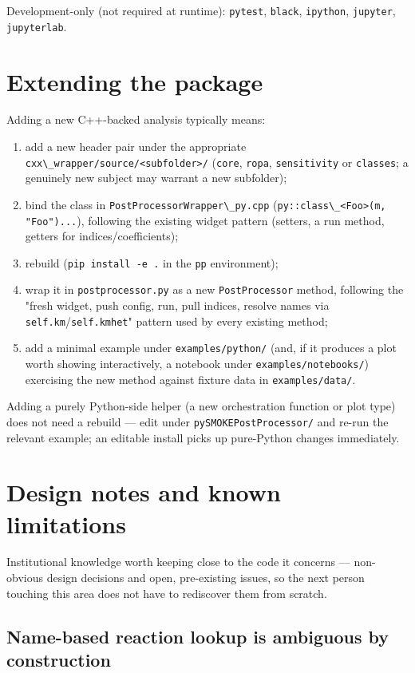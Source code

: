 \documentclass[11pt,a4paper]{report}
\newcommand{\pkg}[1]{\lstinline|#1|}
\begin{document}
Development-only (not required at runtime): \pkg{pytest}, \pkg{black},
\pkg{ipython}, \pkg{jupyter}, \pkg{jupyterlab}.

\chapter{Extending the package}

Adding a new C++-backed analysis typically means:
\begin{enumerate}
\item add a new header pair under the appropriate
  \pkg{cxx\_wrapper/source/<subfolder>/} (\pkg{core}, \pkg{ropa},
  \pkg{sensitivity} or \pkg{classes}; a genuinely new subject may warrant a
  new subfolder);
\item bind the class in \pkg{PostProcessorWrapper\_py.cpp}
  (\pkg{py::class\_<Foo>(m, "Foo")...}), following the existing widget
  pattern (setters, a run method, getters for indices/coefficients);
\item rebuild (\pkg{pip install -e .} in the \pkg{pp} environment);
\item wrap it in \pkg{postprocessor.py} as a new \pkg{PostProcessor} method,
  following the "fresh widget, push config, run, pull indices, resolve
  names via \pkg{self.km}/\pkg{self.kmhet}" pattern used by every existing
  method;
\item add a minimal example under \pkg{examples/python/} (and, if it
  produces a plot worth showing interactively, a notebook under
  \pkg{examples/notebooks/}) exercising the new method against fixture data
  in \pkg{examples/data/}.
\end{enumerate}

Adding a purely Python-side helper (a new orchestration function or plot
type) does not need a rebuild --- edit under \pkg{pySMOKEPostProcessor/} and
re-run the relevant example; an editable install picks up pure-Python
changes immediately.

\chapter{Design notes and known limitations}

Institutional knowledge worth keeping close to the code it concerns ---
non-obvious design decisions and open, pre-existing issues, so the next
person touching this area does not have to rediscover them from scratch.

\section{Name-based reaction lookup is ambiguous by construction}
\end{document}
